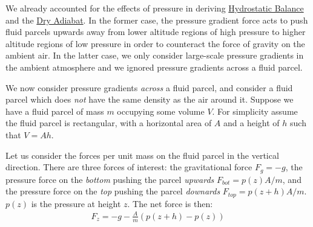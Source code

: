 We already accounted for the effects of pressure in deriving \hyperref[Hydrostatic Balance]{Hydrostatic Balance} and the \hyperref[Dry Adiabat]{Dry Adiabat}. In the former case, the pressure gradient force acts to push fluid parcels upwards away from lower altitude regions of high pressure to higher altitude regions of low pressure in order to counteract the force of gravity on the ambient air. In the latter case, we only consider large-scale pressure gradients in the ambient atmosphere and we ignored pressure gradients across a fluid parcel.

We now consider pressure gradients \textit{across} a fluid parcel, and consider a fluid parcel which does \textit{not} have the same density as the air around it. Suppose we have a fluid parcel of mass \(m\) occupying some volume \(V\). For simplicity assume the fluid parcel is rectangular, with a horizontal area of \(A\) and a height of \(h\) such that \(V=Ah\).

Let us consider the forces per unit mass on the fluid parcel in the vertical direction. There are three forces of interest: the gravitational force \(F_g=-g\), the pressure force on the \textit{bottom} pushing the parcel \textit{upwards} \(F_{bot}=p(z)A/m\), and the pressure force on the \textit{top} pushing the parcel \textit{downards} \(F_{top}=p(z+h)A/m\). \(p(z)\) is the pressure at height \(z\). The net force is then:
\begin{align*}
    F_z=-g-\frac{A}{m}(p(z+h)-p(z))
\end{align*}

